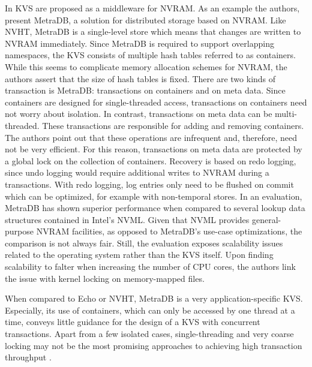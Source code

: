 In \cite{marmol2016nonvolatile} KVS are proposed as a middleware for NVRAM. As
an example the authors, present MetraDB, a solution for distributed storage
based on NVRAM. Like NVHT, MetraDB is a single-level store which means that
changes are written to NVRAM immediately. Since MetraDB is required to support
overlapping namespaces, the KVS consists of multiple hash tables referred to as
containers. While this seems to complicate memory allocation schemes for NVRAM,
the authors assert that the size of hash tables is fixed. There are two kinds of
transaction is MetraDB: transactions on containers and on meta data. Since
containers are designed for single-threaded access, transactions on containers
need not worry about isolation. In contrast, transactions on meta data can be
multi-threaded. These transactions are responsible for adding and removing
containers. The authors point out that these operations are infrequent and,
therefore, need not be very efficient. For this reason, transactions on meta
data are protected by a global lock on the collection of containers. Recovery is
based on redo logging, since undo logging would require additional writes to
NVRAM during a transactions. With redo logging, log entries only need to be
flushed on commit which can be optimized, for example with non-temporal stores.
In an evaluation, MetraDB has shown superior performance when compared to
several lookup data structures contained in Intel's NVML. Given that NVML
provides general-purpose NVRAM facilities, as opposed to MetraDB's use-case
optimizations, the comparison is not always fair. Still, the evaluation exposes
scalability issues related to the operating system rather than the KVS itself.
Upon finding scalability to falter when increasing the number of CPU cores, the
authors link the issue with kernel locking on memory-mapped files.

When compared to Echo or NVHT, MetraDB is a very application-specific KVS.
Especially, its use of containers, which can only be accessed by one thread at a
time, conveys little guidance for the design of a KVS with concurrent
transactions. Apart from a few isolated cases, single-threading and very coarse
locking may not be the most promising approaches to achieving high transaction
throughput \cite{molina1992main}.

